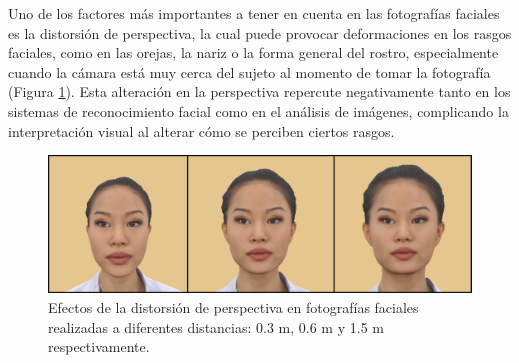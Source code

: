 
Uno de los factores más importantes a tener en cuenta en las fotografías faciales es la distorsión de perspectiva, la cual puede provocar deformaciones en los rasgos faciales, como en las orejas, la nariz o la forma general del rostro, especialmente cuando la cámara está muy cerca del sujeto al momento de tomar la fotografía~\cite{12} (Figura \ref{fig2}). 
Esta alteración en la perspectiva repercute negativamente tanto en los sistemas de reconocimiento facial como en el análisis de imágenes, complicando la interpretación visual al alterar cómo se perciben ciertos rasgos.

\begin{figure}[H]
	\centering
	\includegraphics[scale=0.25]{imagenes/cap1/scd_distorsion.png}
	\caption[Efectos de la distorsión de perspectiva en fotografías faciales.]{Efectos de la distorsión de perspectiva en fotografías faciales realizadas a diferentes distancias: 0.3 m, 0.6 m y 1.5 m respectivamente.}
	\label{fig2}
\end{figure}

